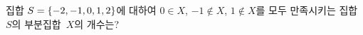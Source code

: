집합 $S=\{-2{,}\mkern3mu\mathopen{}-1{,}\mkern3mu\mathopen{}0{,}\mkern3mu\mathopen{}1{,}\mkern3mu\mathopen{}2\}$에 대하여 $0\in X$, $-1\notin X$, $1\notin X$를 모두 만족시키는 집합~$S$의 부분집합~$X$의 개수는?
